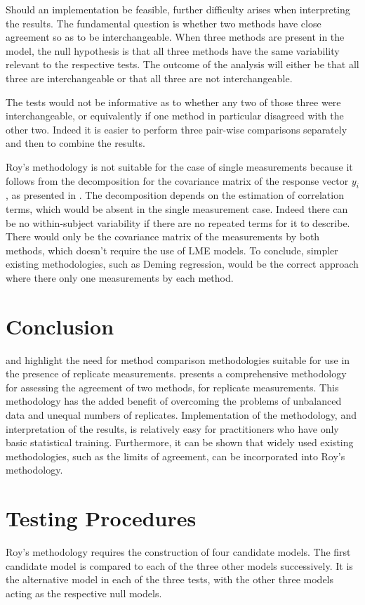 \documentclass[12pt, a4paper]{report}
\theoremstyle{plain}
\theoremstyle{definition}
\theoremstyle{remark}
\begin{document}
Should an implementation be feasible, further difficulty arises when interpreting the results. The fundamental question is whether two methods have close agreement so as to be interchangeable. When three methods are present in the model, the null hypothesis is that all three methods have the same variability relevant to the respective tests. The outcome of the analysis will either be that all three are interchangeable or that all three are not interchangeable.

The tests would not be informative as to whether any two of those three were interchangeable, or equivalently if one method in particular disagreed with the other two. Indeed it is easier to perform three pair-wise comparisons separately and then to combine the results.

Roy's methodology is not suitable for the case of single measurements because it follows from the decomposition for the covariance matrix of the response vector $y_{i}$, as presented in \citet{hamlett}. The decomposition depends on the estimation of correlation terms, which would be absent in the single measurement case. Indeed there can be no within-subject variability if there are no repeated terms for it to describe. There would only be the covariance matrix of the measurements by both methods, which doesn't require the use of LME models. To conclude, simpler existing methodologies, such as Deming regression, would be the correct approach where there only one measurements by each method.

\section{Conclusion}
\citet{BXC2008} and \citet{roy} highlight the need for method comparison methodologies suitable for use in the presence of replicate measurements. \citet{roy} presents a comprehensive methodology for assessing the agreement of two methods, for replicate measurements. This methodology has the added benefit of overcoming the problems of unbalanced data and unequal numbers of replicates. Implementation of the methodology, and interpretation of the results, is relatively easy for practitioners who have only basic statistical training. Furthermore, it can be shown that widely used existing methodologies, such as the limits of agreement, can be incorporated into Roy's methodology.




\section{Testing Procedures}
Roy's methodology requires the construction of four candidate models. The first candidate model is compared to each of the three other models successively. It is the alternative model in each of the three tests, with the other three models acting as the respective null models.
\end{document}
